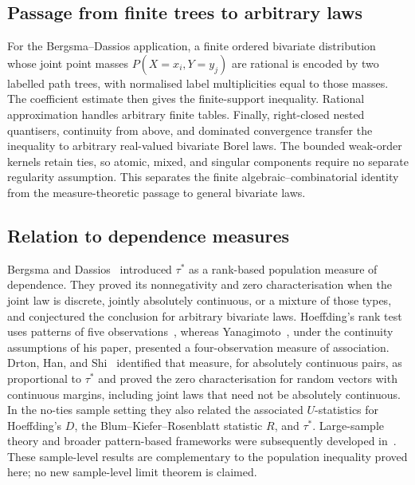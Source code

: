 \documentclass[pdflatex,sn-mathphys-num]{sn-jnl}
\theoremstyle{thmstyleone}
\begin{document}
\subsection{Passage from finite trees to arbitrary laws}
For the Bergsma--Dassios application, a finite ordered bivariate distribution
whose joint point masses $P(X=x_i,Y=y_j)$ are rational is encoded by two
labelled path trees, with normalised label multiplicities equal to those
masses.  The coefficient estimate
then gives the finite-support inequality.  Rational approximation handles
arbitrary finite tables.  Finally, right-closed nested quantisers, continuity
from above, and dominated convergence transfer the inequality to arbitrary
real-valued bivariate Borel laws.  The bounded weak-order kernels retain ties,
so atomic, mixed, and singular components require no separate regularity
assumption.  This separates the finite algebraic--combinatorial identity from
the measure-theoretic passage to general bivariate laws.

\subsection{Relation to dependence measures}
Bergsma and Dassios~\cite{BergsmaDassios2014} introduced $\tau^*$ as a
rank-based population measure of dependence.  They proved its nonnegativity
and zero characterisation when the joint law is discrete, jointly absolutely
continuous, or a mixture of those types, and conjectured the conclusion for
arbitrary bivariate laws.  Hoeffding's rank test uses patterns of five
observations~\cite{Hoeffding1948}, whereas Yanagimoto~\cite{Yanagimoto1970},
under the continuity assumptions of his paper, presented a four-observation
measure of association.  Drton, Han, and Shi~\cite{DrtonHanShi2020} identified
that measure, for absolutely continuous pairs, as proportional to $\tau^*$
and proved the zero characterisation for random vectors with continuous
margins, including joint laws that need not be absolutely continuous.  In the
no-ties sample setting they also related the associated $U$-statistics for
Hoeffding's $D$, the Blum--Kiefer--Rosenblatt statistic $R$, and $\tau^*$.
Large-sample theory and broader pattern-based frameworks were subsequently
developed in~\cite{NandyWeihsDrton2016,WeihsDrtonMeinshausen2018,
BaringhausGruebel2026}.  These sample-level results are complementary to the
population inequality proved here; no new sample-level limit theorem is
claimed.
\end{document}
